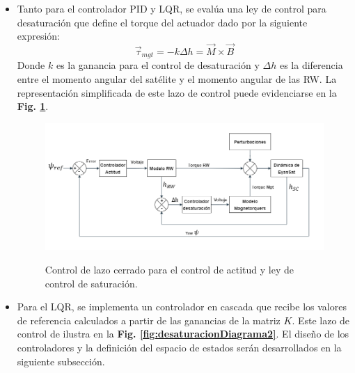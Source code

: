 \begin{itemize}
	 \item Tanto para el controlador PID y LQR, se evalúa una ley de control para desaturación que define el torque del actuador dado por la siguiente expresión:
	 	\begin{equation}
	 		\vec{\tau}_{mgt} = -k\Delta h =\vec{M}\times\vec{B} 
	 	\end{equation} 
	 Donde $k$ es la ganancia para el control de desaturación y $\Delta h$ es la diferencia entre el momento angular del satélite y el momento angular de las RW. La representación simplificada de este lazo de control puede evidenciarse en la \textbf{Fig. \ref{fig:desaturacionDiagrama}}.
	 
	 \begin{figure}[!ht]
	 	\begin{center}
	 		\includegraphics[scale=0.55]{imagenes/controladores/Diagrama_controlador.PNG}\\
	 	\end{center}
	 	\caption{Control de lazo cerrado para el control de actitud y ley de control de saturación.}
	 	\label{fig:desaturacionDiagrama}	 	
	 \end{figure}
	 
	 \item Para el LQR, se implementa un controlador en cascada que recibe los valores de referencia calculados a partir de las ganancias de la matriz $K$. Este lazo de control de ilustra en la \textbf{Fig. \ref{fig:desaturacionDiagrama2}}. El diseño de los controladores y la definición del espacio de estados serán desarrollados en la siguiente subsección.  
	 

\end{itemize}

